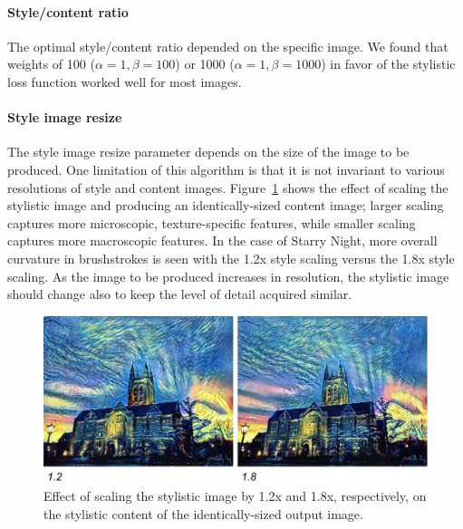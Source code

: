 \documentclass[11pt,letterpaper,journal]{IEEEtran}
\begin{document}
\paragraph{Style/content ratio}

The optimal style/content ratio depended on the specific image. We found that
weights of 100 ($\alpha = 1, \beta = 100$) or 1000 ($\alpha = 1, \beta = 1000$)
in favor of the stylistic loss function worked well for most images.

\paragraph{Style image resize}

The style image resize parameter depends on the size of the image to be
produced. One limitation of this algorithm is that it is not invariant to
various resolutions of style and content images. Figure~\ref{fig:stylescale}
shows the effect of scaling the stylistic image and producing an
identically-sized content image; larger scaling captures more microscopic,
texture-specific features, while smaller scaling captures more macroscopic
features. In the case of Starry Night, more overall curvature in brushstrokes
is seen with the 1.2x style scaling versus the 1.8x style scaling. As the image
to be produced increases in resolution, the stylistic image should change also
to keep the level of detail acquired similar.

\begin{figure}[h]
  \centering
  \includegraphics[width=\linewidth]{stylescale.png}
  \caption{Effect of scaling the stylistic image by 1.2x and 1.8x,
  respectively, on the stylistic content of the identically-sized output image.}
  \label{fig:stylescale}
\end{figure}
\end{document}
